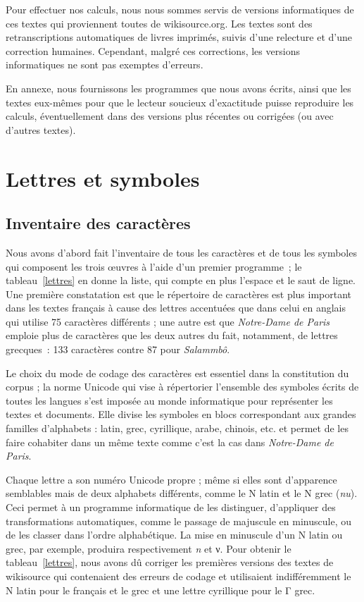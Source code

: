 \documentclass[]{article}
\begin{document}
Pour effectuer nos calculs, nous nous sommes servis de versions informatiques de ces textes qui proviennent toutes de wikisource.org. Les textes sont des retranscriptions automatiques de livres imprimés, suivis d'une relecture et d'une correction humaines. Cependant, malgré ces corrections, les versions informatiques ne sont pas exemptes d'erreurs.

En annexe, nous fournissons les programmes que nous avons écrits, ainsi que les textes eux-mêmes pour que le lecteur soucieux d'exactitude puisse reproduire les calculs, éventuellement dans des versions plus récentes ou corrigées (ou avec d'autres textes).

\section{Lettres et symboles}
\subsection{Inventaire des caractères}
Nous avons d'abord fait l'inventaire de tous les caractères et de tous les symboles qui composent les trois œuvres à l'aide d'un premier programme~; le tableau~\ref{lettres} en donne la liste, qui compte en plus l'espace et le saut de ligne. Une première constatation est que le répertoire de caractères est plus important dans les textes français à cause des lettres accentuées que dans celui en anglais qui utilise 75 caractères différents ; une autre est que \textit{Notre-Dame de Paris} emploie plus de caractères que les deux autres du fait, notamment, de lettres grecques~: 133 caractères contre 87 pour \textit{Salammbô}.

Le choix du mode de codage des caractères est essentiel dans la constitution du corpus ; la norme Unicode qui vise à répertorier l'ensemble des symboles écrits de toutes les langues s'est imposée au monde informatique pour représenter les textes et documents. Elle divise les symboles en blocs correspondant aux grandes familles d'alphabets : latin, grec, cyrillique, arabe, chinois, etc. et permet de les faire cohabiter dans un même texte comme c'est la cas dans \textit{Notre-Dame de Paris}. 

Chaque lettre a son numéro Unicode propre ; même si elles sont d'apparence semblables mais de deux alphabets différents, comme le N latin et le {Ν} grec (\textit{nu}). Ceci permet à un programme informatique de les distinguer, d'appliquer des transformations automatiques, comme le passage de majuscule en minuscule, ou de les classer dans l'ordre alphabétique. La mise en minuscule d'un N latin ou grec, par exemple, produira respectivement \textit{n} et {ν}. Pour obtenir le tableau~\ref{lettres}, nous avons dû corriger les premières versions des textes de wikisource qui contenaient des erreurs de codage et utilisaient indifféremment le N latin pour le français et le grec et une lettre cyrillique pour le {Γ} grec.
\end{document}
